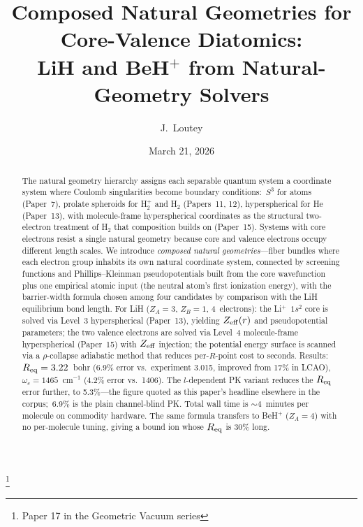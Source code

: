 \documentclass[aps,pra,twocolumn,superscriptaddress,longbibliography,floatfix]{revtex4-2}
\begin{document}
\title{Composed Natural Geometries for Core-Valence Diatomics:\\
LiH and BeH$^+$ from Natural-Geometry Solvers}
\thanks{Paper 17 in the Geometric Vacuum series}

\author{J.~Loutey}

\date{March 21, 2026}

\begin{abstract}
The natural geometry hierarchy assigns each separable quantum system
a coordinate system where Coulomb singularities become boundary
conditions:\ $S^3$ for atoms (Paper~7), prolate spheroids for
H$_2^+$ and H$_2$ (Papers~11, 12), hyperspherical for He (Paper~13),
with molecule-frame hyperspherical coordinates as the structural
two-electron treatment of H$_2$ that composition builds on (Paper~15).
Systems with core electrons resist a single natural geometry because
core and valence electrons occupy different length scales.
We introduce \emph{composed natural geometries}---fiber bundles where
each electron group inhabits its own natural coordinate system,
connected by screening functions and Phillips--Kleinman
pseudopotentials built from the core wavefunction plus one empirical
atomic input (the neutral atom's first ionization energy), with the
barrier-width formula chosen among four candidates by comparison with
the LiH equilibrium bond length.
For LiH ($Z_A=3$, $Z_B=1$, 4~electrons): the Li$^+$~$1s^2$ core is
solved via Level~3 hyperspherical (Paper~13), yielding $Z_{\rm eff}(r)$
and pseudopotential parameters; the two valence electrons are solved via
Level~4 molecule-frame hyperspherical (Paper~15) with $Z_{\rm eff}$
injection; the potential energy surface is scanned via a $\rho$-collapse
adiabatic method that reduces per-$R$-point cost to seconds.
Results: $R_{\rm eq} = 3.22$~bohr (6.9\% error vs.\ experiment 3.015,
improved from 17\% in LCAO),
$\omega_e = 1465$~cm$^{-1}$ (4.2\% error vs.\ 1406).
The $l$-dependent PK variant reduces the $R_{\rm eq}$ error further, to
5.3\%---the figure quoted as this paper's headline elsewhere in the
corpus;\ 6.9\% is the plain channel-blind PK.
Total wall time is ${\sim}4$~minutes per molecule on commodity hardware.
The same formula transfers to BeH$^+$ ($Z_A=4$) with no per-molecule
tuning, giving a bound ion whose $R_{\rm eq}$ is 30\% long.
\end{abstract}
\end{document}
